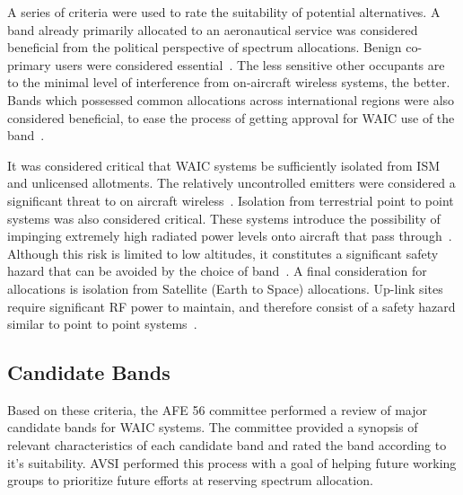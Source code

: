 A series of criteria were used to rate the suitability of potential alternatives. A band already primarily allocated to an aeronautical service was considered beneficial from the political perspective of spectrum allocations. Benign co-primary users were considered essential~\cite{ferrell_feasibility_2007}. The less sensitive other occupants are to the minimal level of interference from on-aircraft wireless systems, the better. Bands which possessed common allocations across international regions were also considered beneficial, to ease the process of getting approval for WAIC use of the band~\cite{ferrell_feasibility_2007}. 

It was considered critical that WAIC systems be sufficiently isolated from ISM and unlicensed allotments. The relatively uncontrolled emitters were considered a significant threat to on aircraft wireless~\cite{ferrell_feasibility_2007}. Isolation from terrestrial point to point systems was also considered critical. These systems introduce the possibility of impinging extremely high radiated power levels onto aircraft that pass through~\cite{ferrell_feasibility_2007}. Although this risk is limited to low altitudes, it constitutes a significant safety hazard that can be avoided by the choice of band~\cite{ferrell_feasibility_2007}. A final consideration for allocations is isolation from Satellite (Earth to Space) allocations. Up-link sites require significant RF power to maintain, and therefore consist of a safety hazard similar to point to point systems~\cite{ferrell_feasibility_2007}. 

\subsection{Candidate Bands}
Based on these criteria, the AFE 56 committee performed a review of major candidate bands for WAIC systems. The committee provided a synopsis of relevant characteristics of each candidate band and rated the band according to it's suitability. AVSI performed this process with a goal of helping future working groups to prioritize future efforts at reserving spectrum allocation. 


